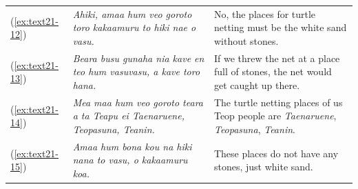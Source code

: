 \documentclass[output=paper]{langscibook}
\begin{document}
\begin{xltabular}{\textwidth}{lXX}
	(\ref{ex:text21-12})&\textit{Ahiki, amaa hum veo goroto toro kakaamuru to hiki nae o vasu.}&No, the places for turtle netting must be the white sand without stones.\\
	(\ref{ex:text21-13})&\textit{Beara busu gunaha nia kave en teo hum vasuvasu, a kave toro hana.}&If we threw the net at a place full of stones, the net would get caught up there.\\
	(\ref{ex:text21-14})&\textit{Mea maa hum veo goroto teara a ta Teapu ei Taenaruene, Teopasuna, Teanin.}&The turtle netting places of us Teop people are \textit{Taenaruene}, \textit{Teopasuna}, \textit{Teanin}.\\
	(\ref{ex:text21-15})&\textit{Amaa hum bona kou na hiki nana to vasu, o kakaamuru koa.}&These places do not have any stones, just white sand.\\
\end{xltabular}
\end{document}

